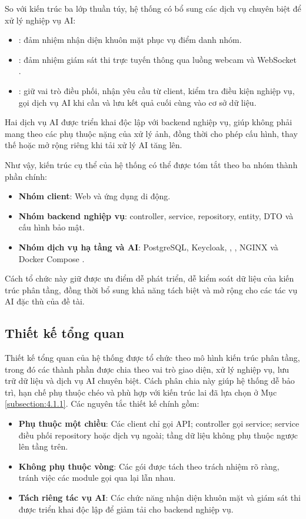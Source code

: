 \documentclass[../DoAn.tex]{subfiles}
\begin{document}
So với kiến trúc ba lớp thuần túy, hệ thống có bổ sung các dịch vụ chuyên biệt để xử lý nghiệp vụ AI:
\begin{itemize}
    \item \textbf{}: đảm nhiệm nhận diện khuôn mặt phục vụ điểm danh nhóm.
    \item \textbf{}: đảm nhiệm giám sát thi trực tuyến thông qua luồng webcam và WebSocket \cite{fastapi_docs2026,fette2011websocket}.
    \item \textbf{}: giữ vai trò điều phối, nhận yêu cầu từ client, kiểm tra điều kiện nghiệp vụ, gọi dịch vụ AI khi cần và lưu kết quả cuối cùng vào cơ sở dữ liệu.
\end{itemize}
Hai dịch vụ AI được triển khai độc lập với backend nghiệp vụ, giúp  không phải mang theo các phụ thuộc nặng của xử lý ảnh, đồng thời cho phép cấu hình, thay thế hoặc mở rộng riêng khi tải xử lý AI tăng lên.

Như vậy, kiến trúc cụ thể của hệ thống có thể được tóm tắt theo ba nhóm thành phần chính:
\begin{itemize}
    \item \textbf{Nhóm client}: Web và ứng dụng di động.
    \item \textbf{Nhóm backend nghiệp vụ}: controller, service, repository, entity, DTO và cấu hình bảo mật.
    \item \textbf{Nhóm dịch vụ hạ tầng và AI}: PostgreSQL, Keycloak, , , NGINX và Docker Compose \cite{keycloak2026,nginx_docs2026,docker_compose_docs2026}.
\end{itemize}
Cách tổ chức này giữ được ưu điểm dễ phát triển, dễ kiểm soát dữ liệu của kiến trúc phân tầng, đồng thời bổ sung khả năng tách biệt và mở rộng cho các tác vụ AI đặc thù của đề tài.

\subsection{Thiết kế tổng quan}
\label{subsection:4.1.2}

Thiết kế tổng quan của hệ thống được tổ chức theo mô hình kiến trúc phân tầng, trong đó các thành phần được chia theo vai trò giao diện, xử lý nghiệp vụ, lưu trữ dữ liệu và dịch vụ AI chuyên biệt. Cách phân chia này giúp hệ thống dễ bảo trì, hạn chế phụ thuộc chéo và phù hợp với kiến trúc lai đã lựa chọn ở Mục \ref{subsection:4.1.1}. Các nguyên tắc thiết kế chính gồm:
\begin{itemize}
    \item \textbf{Phụ thuộc một chiều}: Các client chỉ gọi API; controller gọi service; service điều phối repository hoặc dịch vụ ngoài; tầng dữ liệu không phụ thuộc ngược lên tầng trên.
    \item \textbf{Không phụ thuộc vòng}: Các gói được tách theo trách nhiệm rõ ràng, tránh việc các module gọi qua lại lẫn nhau.
    \item \textbf{Tách riêng tác vụ AI}: Các chức năng nhận diện khuôn mặt và giám sát thi được triển khai độc lập để giảm tải cho backend nghiệp vụ.
\end{itemize}
\end{document}
